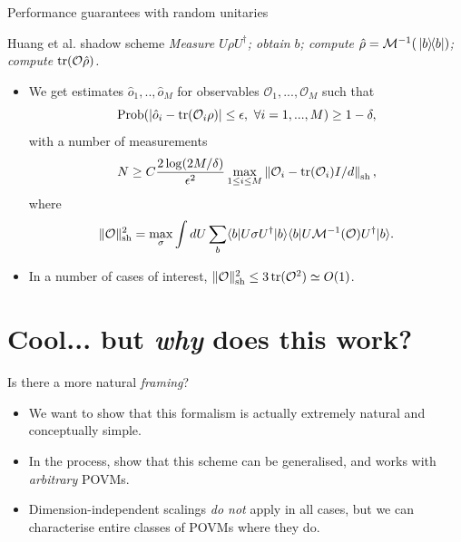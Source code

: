 \documentclass{beamer}
\begin{document}
\begin{frame}{Performance guarantees with random unitaries}\small
    \begin{center}
    \begin{beamerboxesrounded}[shadow=true]{Huang et al. shadow scheme}
    \textit{
    Measure $U\rho U^\dagger$; 
    obtain $b$; 
    compute $\hat\rho=\mathcal M^{-1}(\ketbra*{b})$; 
    compute $\trace(\mathcal O\hat\rho)$.
    }
    \end{beamerboxesrounded}
    \end{center}
    \begin{itemize}\small
        \item We get estimates $\hat o_1,..,\hat o_M$ for observables $\mathcal O_1,..., \mathcal O_M$ such that
        \begin{equation*}
            \operatorname{Prob}(
            |\hat o_i - \trace(\mathcal O_i\rho)|\le\epsilon,\,\,\forall i=1,...,M) \ge1-\delta,
        \end{equation*}
        with a number of measurements
        \begin{equation*}
            N \ge C \frac{2\log(2M/\delta)}{\epsilon^2}
            \max_{1\le i \le M} \left\|\mathcal O_i - \trace(\mathcal O_i) I / d\right\|_{\rm sh},
        \end{equation*}
        where
        \begin{equation*}
            \|\mathcal O\|_{\rm sh}^2 = \max_\sigma
            \int dU\sum_b
            \langle b|U \sigma U^\dagger|b\rangle
            \langle b| U\mathcal M^{-1}(\mathcal O)U^\dagger |b\rangle.
        \end{equation*}
        \item In a number of cases of interest, $\|\mathcal O\|_{\rm sh}^2 \le 3\trace(\mathcal O^2) \simeq O(1)$.
    \end{itemize}
\end{frame}

\section{Cool... but \textit{why} does this work?}

\begin{frame}{Is there a more natural \textit{framing}?}
    \begin{itemize}\setlength\itemsep{1em}
        \item We want to show that this formalism is actually extremely natural and conceptually simple.
        \item In the process, show that this scheme can be generalised, and works with \textit{arbitrary} POVMs.
        \item Dimension-independent scalings \textit{do not} apply in all cases, but we can characterise entire classes of POVMs where they do.
    \end{itemize}
\end{frame}
\end{document}
